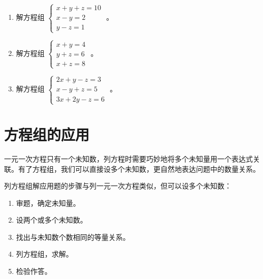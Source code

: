 \begin{practice}


\begin{enumerate}
  \item 解方程组 $\begin{cases} x + y + z = 10 \\ x - y = 2 \\ y - z = 1 \end{cases}$ 。
  \item 解方程组 $\begin{cases} x + y = 4 \\ y + z = 6 \\ x + z = 8 \end{cases}$ 。
  \item 解方程组 $\begin{cases} 2x + y - z = 3 \\ x - y + z = 5 \\ 3x + 2y - z = 6 \end{cases}$ 。
\end{enumerate}


\end{practice}

\section*{方程组的应用}


\begin{explore}


一元一次方程只有一个未知数，列方程时需要巧妙地将多个未知量用一个表达式关联。有了方程组，我们可以直接设多个未知数，更自然地表达问题中的数量关系。

\end{explore}

\begin{understand}


列方程组解应用题的步骤与列一元一次方程类似，但可以设多个未知数：

\begin{enumerate}
  \item 审题，确定未知量。
  \item 设两个或多个未知数。
  \item 找出与未知数个数相同的等量关系。
  \item 列方程组，求解。
  \item 检验作答。
\end{enumerate}


\end{understand}

